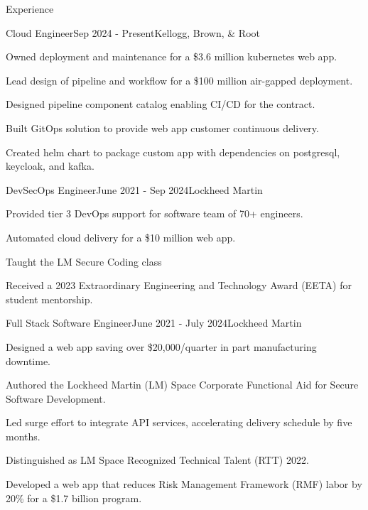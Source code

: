 \documentclass[
	11pt, %
]{resume} %
\begin{document}

\begin{rSection}{Experience}

	\begin{rSubsection}{Cloud Engineer}{Sep 2024 - Present}{Kellogg, Brown, \& Root}
		\item Owned deployment and maintenance for a \$3.6 million kubernetes web app.
		\item Lead design of pipeline and workflow for a \$100 million air-gapped deployment.
		\item Designed pipeline component catalog enabling CI/CD for the contract.
		\item Built GitOps solution to provide web app customer continuous delivery.
		\item Created helm chart to package custom app with dependencies on postgresql, keycloak, and kafka.
	\end{rSubsection}


	\begin{rSubsection}{DevSecOps Engineer}{June 2021 - Sep 2024}{Lockheed Martin}
		\item Provided tier 3 DevOps support for software team of 70+ engineers.
		\item Automated cloud delivery for a \$10 million web app.
		\item Taught the LM Secure Coding class
		\item Received a 2023 Extraordinary Engineering and Technology Award (EETA) for student mentorship.
	\end{rSubsection}


	\begin{rSubsection}{Full Stack Software Engineer}{June 2021 - July 2024}{Lockheed Martin}
		\item Designed a web app saving over \$20,000/quarter in part manufacturing downtime.
		\item Authored the Lockheed Martin (LM) Space Corporate Functional Aid for Secure Software Development.
		\item Led surge effort to integrate API services, accelerating delivery schedule by five months.
		\item Distinguished as LM Space Recognized Technical Talent (RTT) 2022.
		\item Developed a web app that reduces Risk Management Framework (RMF) labor by 20\% for a \$1.7 billion program.
	\end{rSubsection}


\end{rSection}
\end{document}
